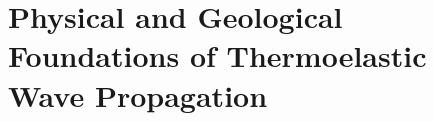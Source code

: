 \section{Physical and Geological Foundations of Thermoelastic Wave Propagation}

























